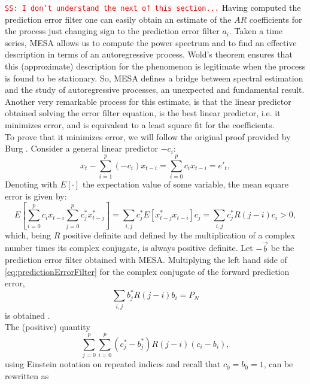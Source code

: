 \documentclass[twocolumn,showpacs,preprintnumbers,nofootinbib,prd,
superscriptaddress,10pt]{revtex4-1}
\newcommand{\sschmidt}[1]{{\textcolor{red}{\texttt{SS: #1}} }}
\begin{document}
\sschmidt{I don't understand the next of this section...}
Having computed the prediction error filter one can easily obtain an estimate of the $AR$ coefficients for the process just changing sign to the prediction error filter $a_i$.
Taken a time series, MESA allows us to compute the power spectrum and to find an effective description in terms of an autoregressive process. 
Wold's theorem ensures that this (approximate) description for the phenomenon is legitimate when the process is found to be stationary. So, MESA defines a bridge between spectral estimation and the study of autoregressive processes, an unexpected and fundamental result. \\
Another very remarkable process for this estimate, is that the linear predictor obtained solving the error filter equation, is the best linear predictor, i.e. it minimizes error, and is equivalent to a least square fit for the coefficients. \cite{VDBos}  \\ 
To prove that it minimizes error, we will follow the original proof provided by Burg \cite{burg1975maximum}. Consider a general linear predictor $-c_i$: 
\begin{equation}
    x_{t} - \sum_{i = 1}^p (-c_i)x_{t - i} = \sum_{i = 0}^p c_i x_{t - i} = e'_t, 
\end{equation}
Denoting with $E\left[\cdot\right]$ the expectation value of some variable, the mean square error is given by: 
\begin{equation}
E\left[\sum_{i = 0}^p c_i x_{t-i}\sum_{j = 0}^p c^*_j x^*_{t - j}\right] = \sum_{i,j} c^*_j E\left[x^*_{t-j}x_{t-i} \right] c_j = \sum_{i, j}c^*_j R(j - i) c_i > 0,
\end{equation}
which, being $R$ positive definite and defined by the multiplication of a complex number times its complex conjugate, is always positive definite. 
Let $-\vec{b}$ be the prediction error filter obtained with MESA. Multiplying the left hand side of \ref{eq:predictionErrorFilter} for the complex conjugate of the forward prediction error, 
\begin{equation}\nonumber 
    \sum_{i,j}b^*_jR(j-i)b_i = P_N
\end{equation}
is obtained . \\ 
The (positive) quantity  
\begin{equation}\label{eq:linearPredictor}
    \sum_{j = 0}^p\sum_{i = 0}^p(c^*_j - b^*_j)R(j-i)(c_i - b_i),
\end{equation}
using Einstein notation on repeated indices and recall that $c_0 = b_0 = 1$, can be rewritten as 
\end{document}
